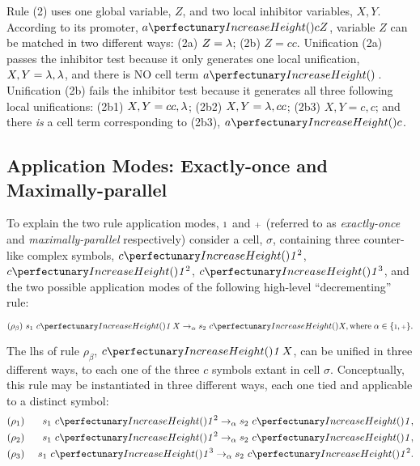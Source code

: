 Rule (2) uses one global variable, \(Z\), and two local \gls{inhibitor} variables, \(X, Y\).
According to its \gls{promoter}, \(\cpfunc{a}{cZ}\), variable \(Z\) can be matched in two different ways: 
(2a) \(Z = \lambda\); (2b) \(Z = cc\).
Unification (2a) passes the \gls{inhibitor} test because it only generates one local unification,
\(X, Y = \lambda, \lambda\), and there is NO cell term \(\cpfunc{a}{\,}\).
Unification (2b) fails the \gls{inhibitor} test because it generates all three following local unifications:
(2b1) \(X, Y = cc, \lambda\); (2b2) \(X, Y = \lambda, cc\); (2b3) \(X, Y = c, c\); 
and there \emph{is} a cell term corresponding to (2b3), \(\cpfunc{a}{c}\).

\subsection{\label{sec:cps:applicationmodes}Application Modes: Exactly-once and Maximally-parallel}
To explain the two rule application modes, \({\scriptstyle 1}\) and \({\scriptstyle +}\) (referred to as \emph{exactly-once} and \emph{maximally-parallel} respectively) consider a cell, \(\sigma\), containing three counter-like complex symbols,
\(\cpfunc{c}{\cpundig^2}\), \(\cpfunc{c}{\cpundig^2}\), \(\cpfunc{c}{\cpundig^3}\),
and the two possible application modes of the following high-level ``decrementing'' rule:
\vspace{-0.2cm}
\begin{framed}
\vspace{-0.5cm}
\[(\rho_\beta) ~s_1 ~\cpfunc{c}{\cpundig \, X} \rightarrow_{\alpha} s_2 ~\cpfunc{c}{X},\\
\mathrm{where} \; \alpha \in \{\cponce, \cpmaxpar\}.\]
\vspace{-0.8cm}
\end{framed}

The \gls{lhs} of rule \(\rho_\beta\), \(\cpfunc{c}{\cpundig \, X}\), can be unified in three different ways,
to each one of the three \(c\) symbols extant in cell \(\sigma\).
Conceptually, this rule may be instantiated in three different ways,
each one tied and applicable to a distinct symbol:
\begin{eqnarray*}
& (\rho_1)  & ~s_1 ~\cpfunc{c}{\cpundig^2} \rightarrow_{\alpha} s_2 ~\cpfunc{c}{\cpundig},\\
& (\rho_2)  & ~s_1 ~\cpfunc{c}{\cpundig^2} \rightarrow_{\alpha} s_2 ~\cpfunc{c}{\cpundig},\\
& (\rho_3) & ~s_1 ~\cpfunc{c}{\cpundig^3} \rightarrow_{\alpha} s_2 ~\cpfunc{c}{\cpundig^2}.
\end{eqnarray*}

